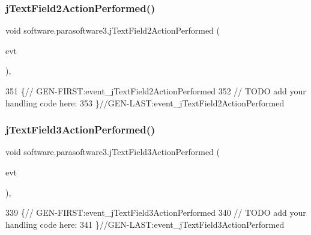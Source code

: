 \subsubsection{\texorpdfstring{j\+Text\+Field2\+Action\+Performed()}{jTextField2ActionPerformed()}}
{\footnotesize\ttfamily void software.\+parasoftware3.\+j\+Text\+Field2\+Action\+Performed (\begin{DoxyParamCaption}\item[{java.\+awt.\+event.\+Action\+Event}]{evt }\end{DoxyParamCaption})\hspace{0.3cm}{\ttfamily [inline]}, {\ttfamily [private]}}


\begin{DoxyCode}
351                                                                             \{\textcolor{comment}{//
      GEN-FIRST:event\_jTextField2ActionPerformed}
352         \textcolor{comment}{// TODO add your handling code here:}
353     \}\textcolor{comment}{//GEN-LAST:event\_jTextField2ActionPerformed}
\end{DoxyCode}
\mbox{\label{classsoftware_1_1parasoftware3_a2332853b1533b03c93fb6af67852c214}} 
\subsubsection{\texorpdfstring{j\+Text\+Field3\+Action\+Performed()}{jTextField3ActionPerformed()}}
{\footnotesize\ttfamily void software.\+parasoftware3.\+j\+Text\+Field3\+Action\+Performed (\begin{DoxyParamCaption}\item[{java.\+awt.\+event.\+Action\+Event}]{evt }\end{DoxyParamCaption})\hspace{0.3cm}{\ttfamily [inline]}, {\ttfamily [private]}}


\begin{DoxyCode}
339                                                                             \{\textcolor{comment}{//
      GEN-FIRST:event\_jTextField3ActionPerformed}
340         \textcolor{comment}{// TODO add your handling code here:}
341     \}\textcolor{comment}{//GEN-LAST:event\_jTextField3ActionPerformed}
\end{DoxyCode}
\mbox{\label{classsoftware_1_1parasoftware3_a7cb85bd10b5032e0558802540683510f}} 
